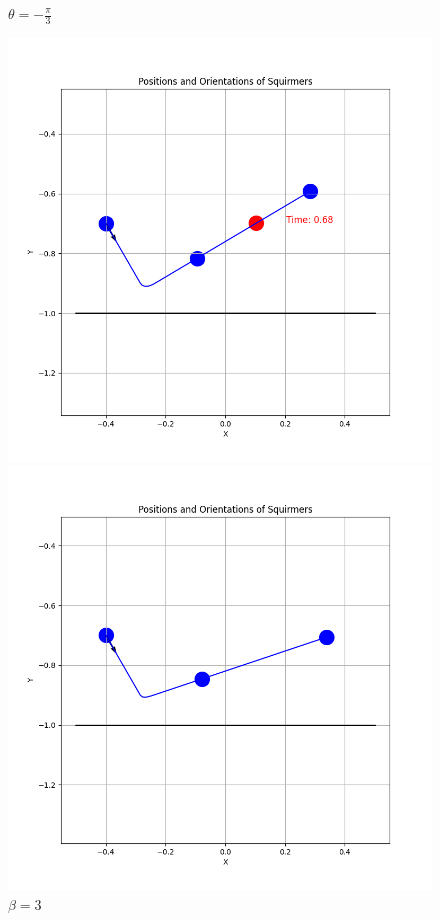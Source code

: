 \documentclass{article}
\begin{document}
\begin{figure}[H]
    \centering
    \textbf{$\theta = -\frac{\pi}{3}$}\par\medskip
    \begin{minipage}{0.49\textwidth}
        \includegraphics[width=1.1\textwidth]{graphs/simulations/border/beta1_5/mpi_3.png}
        \caption{\footnotesize $\beta = 1.5$}
    \end{minipage}\hfill
    \begin{minipage}{0.49\textwidth}
        \includegraphics[width=1.1\textwidth]{graphs/simulations/border/beta3/mpi_3.png}
        \caption{\footnotesize $\beta = 3$}
    \end{minipage}
\end{figure}
\end{document}
